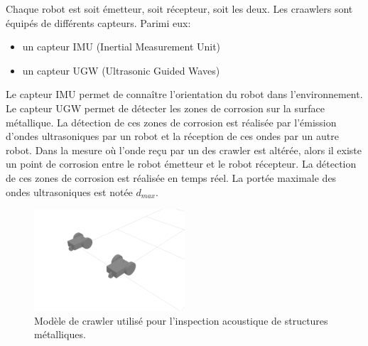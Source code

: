 \documentclass[francais,RandD]{rapportPFE}
\begin{document}
			Chaque robot est soit émetteur, soit récepteur, soit les deux.
			Les craawlers sont équipés de différents capteurs.
			Parimi eux:
			\begin{itemize}
				\item un capteur IMU (Inertial Measurement Unit)
				\item un capteur UGW (Ultrasonic Guided Waves)
			\end{itemize}
			Le capteur IMU permet de connaître l'orientation du robot dans l'environnement.
			Le capteur UGW permet de détecter les zones de corrosion sur la surface métallique.
			La détection de ces zones de corrosion est réalisée par l'émission d'ondes ultrasoniques par un robot et la réception de ces ondes par un autre robot.
			Dans la mesure où l'onde reçu par un des crawler est altérée, alors il existe un point de corrosion entre le robot émetteur et le robot récepteur.
			La détection de ces zones de corrosion est réalisée en temps réel.
			La portée maximale des ondes ultrasoniques est notée $d_{max}$.




			\begin{figure}[h]
				\centering
				\includegraphics[width=0.5\textwidth]{graphics/crawlers.png}
				\caption{Modèle de crawler utilisé pour l'inspection acoustique de structures métalliques.}
				\label{fig:crawler}
			\end{figure}
\end{document}
